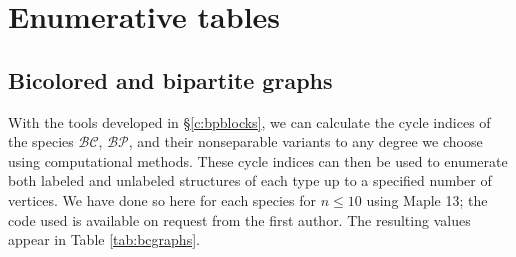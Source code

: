 \documentclass[sectionflow,singlespace,twoside,boldmathhdr]{brandiss} %
\numberwithin{section}{chapter}
\numberwithin{figure}{chapter}
\begin{document}
\chapter{Enumerative tables}\label{c:enum}
\section{Bicolored and bipartite graphs}\label{s:bpenum}
With the tools developed in \S \ref{c:bpblocks}, we can calculate the cycle indices of the species $\mathcal{BC}$, $\mathcal{BP}$, and their nonseparable variants to any degree we choose using computational methods.
These cycle indices can then be used to enumerate both labeled and unlabeled structures of each type up to a specified number of vertices.
We have done so here for each species for $n \leq 10$ using Maple 13; the code used is available on request from the first author.
The resulting values appear in Table \ref{tab:bcgraphs}.
\end{document}
